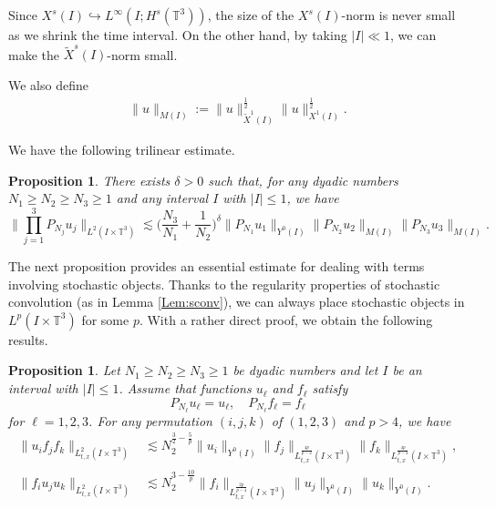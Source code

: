 \documentclass[letterpaper, 11pt,  reqno]{amsart}
\newtheorem{proposition}[theorem]{Proposition}
\newcommand{\1}{\hspace{0.5mm}\text{I}\hspace{0.5mm}}
\newcommand{\noi}{\noindent}
\newcommand{\T}{\mathbb{T}}
\newcommand{\wt}{\widetilde}
\renewcommand{\l}{\ell}
\newcommand{\les}{\lesssim}
\numberwithin{equation}{section}
\numberwithin{theorem}{section}
\begin{document}
\noi
Since $X^s(I) \hookrightarrow L^\infty(I; H^s(\T^3))$,
the size of the $X^s(I)$-norm is never small as we shrink the time interval.
On the other hand,
by taking $|I| \ll 1$, we can make the $\wt X^s(I)$-norm small.







We also define
\begin{align}
\label{M-norm}
\| u \|_{M(I)} :=
\|u\|_{\wt X^1(I)}^{\frac 12} 
\|u\|_{X^1(I)}^{\frac 12}.
\end{align}


\noi
We have the following trilinear estimate.

\begin{proposition}{\cite[Proposition 3.1]{IP12}}
\label{Prop:uuu}
There exists $\delta>0$ such that, for any dyadic numbers $N_1\geq N_2 \geq N_3\geq
1$ and any interval $I$ with $|I|\leq 1$, we have
\[
\Big\| \prod_{j=1}^3P_{N_j} u_j \Big\|_{L^2(I\times \T^3)}\les
\Big( \frac{N_3}{N_1}+\frac{1}{N_2} \Big)^\delta
\|P_{N_1}u_1\|_{Y^0(I)}
\|P_{N_2}u_2 \|_{M(I)}\|P_{N_3}u_3 \|_{M(I)}.
\]


\end{proposition}












The next proposition provides an essential estimate for dealing with terms involving stochastic objects. 
Thanks to the regularity properties of stochastic convolution (as in Lemma \ref{Lem:sconv}), 
we can always place stochastic objects in $L^p(I\times \T^3)$ for some $p$. 
With a rather direct proof, we obtain the following results.


\begin{proposition}\label{Prop:uff}
Let $N_1\geq N_2\geq N_3\geq 1$ be dyadic numbers and let $I$ be an interval with $|I| \le 1$.
Assume that functions $u_\l$ and $f_\l$ satisfy
\[
P_{N_\l} u_\l = u_\l, \quad
P_{N_\l} f_\l = f_\l
\]
for $\l=1,2,3$.
For any permutation $(i,j,k)$ of $(1,2,3)$ and $p>4$,
we have
\begin{align}
\label{eq:uff}
\|
u_i f_j f_k
\|_{L^2_{t,x}(I\times \T^3)}
&\lesssim
N_2^{\frac{3}{2}-\frac{5}{p}}
\| u_i\|_{Y^0 (I)}
\| f_j\|_{L_{t,x}^{\frac{4p}{p-2}}(I\times \T^3) }
\| f_k\|_{L_{t,x}^{\frac{4p}{p-2}}(I\times \T^3) },
\\
\label{eq:uuf}
\| f_i u_j u_k \|_{L_{t,x}^2(I\times\T^3)}
&\les
N_2^{3-\frac{10}{p}}
\| f_i\|_{L_{t,x}^{\frac{2p}{p-4}}(I\times\T^3)}
\| u_{j} \|_{Y^0(I)}
\| u_{k} \|_{Y^0(I)}
.
\end{align}
\end{proposition}
\end{document}
